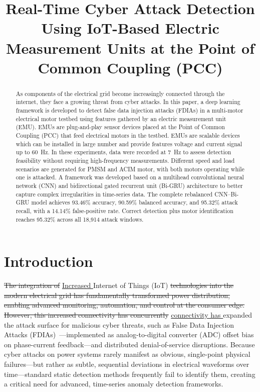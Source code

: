 \documentclass[conference,letterpaper]{IEEEtran}
\providecommand{\DIFadd}[1]{{\protect\color{blue}\uline{#1}}} %
\providecommand{\DIFdel}[1]{{\protect\color{red}\sout{#1}}}                      %
\providecommand{\DIFaddbegin}{} %
\providecommand{\DIFaddend}{} %
\providecommand{\DIFdelbegin}{} %
\providecommand{\DIFdelend}{} %
\begin{document}
\title{Real-Time Cyber Attack Detection Using IoT-Based Electric Measurement Units at the Point of Common Coupling (PCC)}
\author{
}
\maketitle
\raggedbottom


\begin{abstract}
As components of the electrical grid become increasingly connected through the internet, they face a growing threat from cyber attacks. In this paper, a deep learning framework is developed to detect false data injection attacks (FDIAs) in a multi-motor electrical motor testbed using features gathered by an electric measurement unit (EMU). EMUs are plug-and-play sensor devices placed at the Point of Common Coupling (PCC) that feed electrical motors in the testbed. EMUs are scalable devices which can be installed in large number and provide features voltage and current signal up to 60~Hz. In these experiments, data were recorded at 7~Hz to assess detection feasibility without requiring high-frequency measurements. Different speed and load scenarios are generated for PMSM and ACIM motor, with both motors operating while one is attacked.
A framework was developed based on a multihead convolutional neural network (CNN) and bidirectional gated recurrent unit (Bi-GRU) architecture to better capture complex irregularities in time-series data. The complete rebalanced CNN--Bi-GRU model achieves 93.46\% accuracy, 90.59\% balanced accuracy, and 95.32\% attack recall, with a 14.14\% false-positive rate. Correct detection plus motor identification reaches 95.32\% across all 18,914 attack windows.
\end{abstract}

\section{Introduction}
\DIFdelbegin \DIFdel{The integration of }\DIFdelend \DIFaddbegin \DIFadd{Increased }\DIFaddend Internet of Things (IoT) \DIFdelbegin \DIFdel{technologies into the modern electrical grid has fundamentally transformed power distribution, enabling advanced monitoring, automation, and control at the consumer edge. However, this increased connectivity has concurrently }\DIFdelend \DIFaddbegin \DIFadd{connectivity has }\DIFaddend expanded the attack surface for malicious cyber threats, such as False Data Injection Attacks (FDIAs)~\cite{liu2009}---implemented as analog-to-digital converter (ADC) offset bias on phase-current feedback---and distributed denial-of-service disruptions. Because cyber attacks on power systems rarely manifest as obvious, single-point physical failures---but rather as subtle, sequential deviations in electrical waveforms over time---standard static detection methods frequently fail to identify them, creating a critical need for advanced, time-series anomaly detection frameworks.
\end{document}
